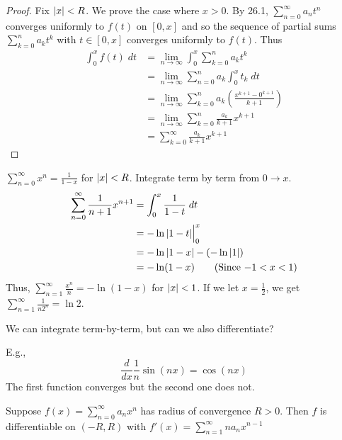 \documentclass{article}
\begin{document}
      \begin{proof}
        Fix $\abs{x} < R$. We prove the case where $x > 0$.
        By 26.1, $\sum_{n=0}^\infty a_nt^n$ converges uniformly to $f(t)$ on $[0, x]$ and so the sequence of partial sums $\sum_{k=0}^n a_kt^k$ with $t \in [0, x]$ converges uniformly to $f(t)$. Thus
        \begin{align*}
          \int_0^x f(t) \; dt &= \lim_{n\to\infty}\int_0^x \sum_{k=0}^n a_kt^k\\
          &= \lim_{n\to\infty} \sum_{n=0}^n a_k\int_0^x t_k \; dt \tag{33.3}\\
          &= \lim_{n\to\infty}\sum_{k=0}^n a_k\left(\frac{x^{k+1} - 0^{k+1}}{k+1}\right)\\
          &= \lim_{n\to\infty} \sum_{k=0}^n \frac{a_k}{k+1}x^{k+1}\\
          &= \sum_{k=0}^\infty \frac{a_k}{k+1} x^{k+1}
        \end{align*}
      \end{proof}
      \begin{example}
        $\sum_{n=0}^\infty x^n = \frac{1}{1-x}$ for $\abs{x} < R$. Integrate term by term from $0 \to x$.
        \begin{align*}
          \sum_{n=0}^\infty \frac{1}{n+1}x^{n+1} &= \int_0^x \frac{1}{1-t} \; dt\\
          &= -\ln \abs{1-t}\Big|_0^x\\
          &= -\ln\abs{1-x}-(-\ln\abs{1})\\
          &= -\ln(1-x) \tag{Since $-1 < x < 1$}\\
        \end{align*}
        Thus, $\sum_{n=1}^\infty \frac{x^n}{n} = -\ln(1-x)$ for $\abs{x}<1$. If we let $x = \frac{1}{2}$, we get $\sum_{n=1}^\infty \frac{1}{n2^n} = \ln 2$.
      \end{example}
      \begin{remark}
        We can integrate term-by-term, but can we also differentiate?

        E.g.,
        \[
          \frac{d}{dx} \frac{1}{n}\sin(nx) = \cos(nx)
        \]
        The first function converges but the second one does not.
      \end{remark}
      \begin{cthm}[Theorem 26.5]
        Suppose $f(x) = \sum_{n=0}^\infty a_nx^n$ has radius of convergence $R > 0$. Then $f$ is differentiable on $(-R, R)$ with $f'(x) = \sum_{n=1}^\infty na_nx^{n-1}$
      \end{cthm}
\end{document}
